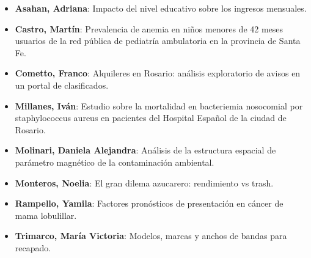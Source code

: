 \begin{itemize}
\item \textbf{Asahan, Adriana}: Impacto del nivel educativo sobre los ingresos mensuales.
\item \textbf{Castro, Martín}: Prevalencia de anemia en niños menores de 42 meses usuarios de la red pública de pediatría ambulatoria en la provincia de Santa Fe.
\item \textbf{Cometto, Franco}: Alquileres en Rosario: análisis exploratorio de avisos en un portal de clasificados.
\item \textbf{Millanes, Iván}: Estudio sobre la mortalidad en bacteriemia nosocomial por staphylococcus aureus en pacientes del Hospital Español de la ciudad de Rosario.
\item \textbf{Molinari, Daniela Alejandra}: Análisis de la estructura espacial de parámetro magnético de la contaminación ambiental.
\item \textbf{Monteros, Noelia}: El gran dilema azucarero: rendimiento vs trash.
\item \textbf{Rampello, Yamila}: Factores pronósticos de presentación en cáncer de mama lobulillar.
\item \textbf{Trimarco, María Victoria}: Modelos, marcas y anchos de bandas para recapado.
\end{itemize}






